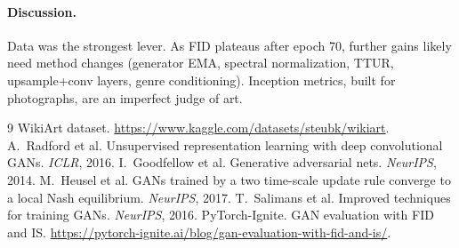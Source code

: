 \documentclass{article}
\begin{document}
\paragraph{Discussion.} Data was the strongest lever. As FID plateaus after epoch 70, further gains likely need method changes (generator EMA, spectral normalization, TTUR, upsample+conv layers, genre conditioning). Inception metrics, built for photographs, are an imperfect judge of art.

{\footnotesize
\setlength{\itemsep}{0pt}\setlength{\parskip}{0pt}
\begin{thebibliography}{9}\setlength{\itemsep}{0pt}
 WikiArt dataset. \url{https://www.kaggle.com/datasets/steubk/wikiart}.
 A.~Radford et al. Unsupervised representation learning with deep convolutional GANs. \emph{ICLR}, 2016.
 I.~Goodfellow et al. Generative adversarial nets. \emph{NeurIPS}, 2014.
 M.~Heusel et al. GANs trained by a two time-scale update rule converge to a local Nash equilibrium. \emph{NeurIPS}, 2017.
 T.~Salimans et al. Improved techniques for training GANs. \emph{NeurIPS}, 2016.
 PyTorch-Ignite. GAN evaluation with FID and IS. \url{https://pytorch-ignite.ai/blog/gan-evaluation-with-fid-and-is/}.
\end{thebibliography}
}
\end{document}
